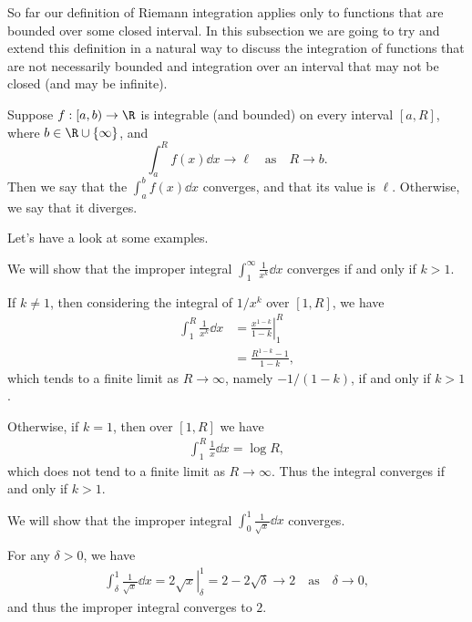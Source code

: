 So far our definition of Riemann integration applies only to functions that are bounded over some closed interval. In this subsection we are going to try and extend this definition in a natural way to discuss the integration of functions that are not necessarily bounded and integration over an interval that may not be closed (and may be infinite).

\begin{definition}
	Suppose $f:[a, b) \rightarrow \R$ is integrable (and bounded) on every interval $[a, R]$, where $b \in \R \cup \{\infty\}$, and
	$$
	\int_a^R f(x) \dd x \rightarrow \ell \quad \text{as} \quad R \rightarrow b.
	$$
	Then we say that the  $\int_a^{b} f(x) \dd x$ converges, and that its value is $\ell$. Otherwise, we say that it diverges. 
\end{definition}

Let's have a look at some examples.

\begin{example}
	We will show that the improper integral
	$
	\displaystyle\int_1^{\infty} \frac{1}{x^k} \dd x
	$
	converges if and only if $k > 1$.

	If $k \neq 1$, then considering the integral of $1/x^k$ over $[1, R]$, we have
	\begin{align*}
	\int_1^R \frac{1}{x^k} \dd x &= \left.\frac{x^{1 - k}}{1 - k}\right|_1^R \\
	&= \frac{R^{1 - k} - 1}{1 - k},
	\end{align*}
	which tends to a finite limit as $R \rightarrow \infty$, namely $-1/(1 - k)$, if and only if $k > 1$.

	Otherwise, if $k = 1$, then over $[1 , R]$ we have
	\begin{align*}
		\int_1^R \frac{1}{x} \dd x = \log R,
	\end{align*}
	which does not tend to a finite limit as $R \rightarrow \infty$.
	Thus the integral converges if and only if $k > 1$.
\end{example}

\begin{example}
	We will show that the improper integral
	$\displaystyle \int_0^1 \frac{1}{\sqrt{x}} \dd x$ converges.

	For any $\delta > 0$, we have 
	\begin{align*}
		\int_\delta^1 \frac{1}{\sqrt{x}} \dd x = \left. 2\sqrt{x} \right|_\delta^1 = 2 - 2\sqrt{\delta} \rightarrow 2 \quad \text{as} \quad \delta \rightarrow 0,
	\end{align*}
	and thus the improper integral converges to $2$.
\end{example}

